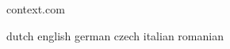 


\startlogginginterface context.com



\startcommands                    dutch                            english
                                  german                           czech
                                  italian                          romanian

